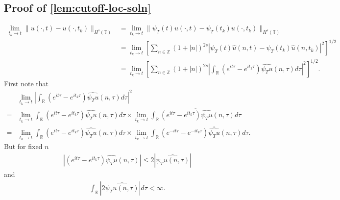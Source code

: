 \documentclass[12pt,reqno]{amsart}
\numberwithin{equation}{section}  %
\numberwithin{figure}{section}
\newcommand{\rr}{\mathbb{R}}
\newcommand{\zz}{\mathbb{Z}}
\newcommand{\ci}{\mathbb{T}}
\newcommand{\wh}{\widehat}
\theoremstyle{plain}
\theoremstyle{definition}
\theoremstyle{remark}
\begin{document}
\subsection{Proof of \autoref{lem:cutoff-loc-soln}}
%
%
\begin{equation}
  \label{dm}
	\begin{split}
		\lim_{t_{k} \to t} \|u(\cdot, t) - u(\cdot, t_{k})\|_{H^s(\ci)} 
    & = \lim_{t_{k} \to t} \|\psi_{T}(t) u(\cdot, t) - \psi_{T}(t_{k}) u(\cdot, t_{k})\|_{H^s(\ci)} 
		\\
		& = \lim_{t_{k} \to t} \left[ \sum_{n \in \zz}\left( 1 + | n |
    \right)^{2s} | \psi_{T}(t)  \wh{u}(n, t) - \psi_{T}(t_{k}) \wh{ u}(n, t_{k}) |^2 \right]^{1/2}
		\\
		& = \lim_{t_{k} \to t} \left[ \sum_{n \in \zz} \left( 1 + | n |
    \right)^{2s} | \int_{\rr} (e^{it \tau} - e^{it_{k} \tau})
    \wh{\psi_{T} u}(n,
		\tau) d \tau |^2 \right]^{1/2}.
	\end{split}
\end{equation}
First note that
%
%
%
%
\begin{equation*}
\begin{split}
& \lim_{t_{k} \to t}  | \int_{\rr} (e^{it \tau} - e^{it_{k} \tau})
    \wh{\psi_{T} u}(n,
		\tau) d \tau |^2 
    \\
    = 
     & \lim_{t_{k} \to t}  \int_{\rr} (e^{it \tau} - e^{it_{k} \tau})
    \wh{\psi_{T} u}(n,
    \tau) d \tau \times \lim_{t_{k} \to t} \overline{\int_{\rr} (e^{it \tau} - e^{it_{k} \tau})
    \wh{\psi_{T} u}(n,
    \tau) d \tau }  
    \\
    = 
    &  \lim_{t_{k} \to t}  \int_{\rr} (e^{it \tau} - e^{it_{k} \tau})
    \wh{\psi_{T} u}(n,
    \tau) d \tau \times \lim_{t_{k} \to t} \int_{\rr} (e^{-it \tau} - e^{-it_{k} \tau})
    \overline{\wh{\psi_{T} u}}(n,
    \tau) d \tau.   
    \end{split}
\end{equation*}
%
%
But for fixed $n$ 
%
%
\begin{equation*}
\begin{split}
|(e^{it \tau} - e^{it_{k} \tau})  
    \wh{\psi_{T} u}(n, \tau) | \le 2 |\wh{\psi_{T} u(n, \tau)} |
\end{split}
\end{equation*}
%
%
and
%
%
%
\begin{equation*}
\begin{split}
  \int_{\rr} |2 \wh{\psi_{T} u(n, \tau)} | d \tau < \infty.
\end{split}
\end{equation*}
\end{document}
